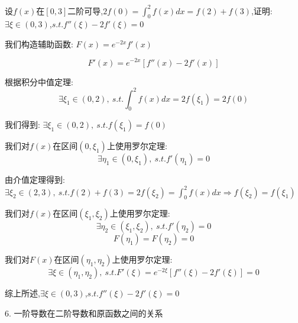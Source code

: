 \begin{proposition}
	设$f(x)$在$[0,3]$二阶可导,$2f(0)=\int_{0}^{2}f(x)dx=f(2)+f(3)$,证明: $\exists \xi\in(0,3)$,$s.t. f''(\xi)-2f'(\xi)=0$
\end{proposition}
\begin{solution}

	我们构造辅助函数: $F(x)=e^{-2x}f'(x)$

	$$F'(x)=e^{-2x}[f''(x)-2f'(x)]$$

	根据积分中值定理:
	$$\exists \xi_{1}\in(0,2),\ s.t. \int_{0}^{2}f(x)dx=2f(\xi_{1})=2f(0)$$

	我们得到: $\exists \xi_{1}\in(0,2),\ s.t.f(\xi_{1})=f(0)$

	我们对$f(x)$在区间$(0,\xi_{1})$上使用罗尔定理:
	$$\exists \eta_{1}\in(0,\xi_{1}),\ s.t. f'(\eta_{1})=0$$

	由介值定理得到: $\exists \xi_{2}\in(2,3),\ s.t. f(2)+f(3)=2f(\xi_{2})=\int_{0}^{2}f(x)dx\Rightarrow f(\xi_{2})=f(\xi_{1})$

	我们对$f(x)$在区间$(\xi_{1},\xi_{2})$上使用罗尔定理:
	$$\exists \eta_{2}\in(\xi_{1},\xi_{2}),\ s.t. f'(\eta_{2})=0$$
	$$F(\eta_{1})=F(\eta_{2})=0$$

	我们对$F(x)$在区间$(\eta_{1},\eta_{2})$上使用罗尔定理:
	$$\exists \xi\in(\eta_{1},\eta_{2}),\ s.t. F'(\xi)=e^{-2\xi}[f''(\xi)-2f'(\xi)]=0$$

	综上所述,$\exists \xi\in(0,3)$,$s.t. f''(\xi)-2f'(\xi)=0$
\end{solution}


6. 一阶导数在二阶导数和原函数之间的关系


